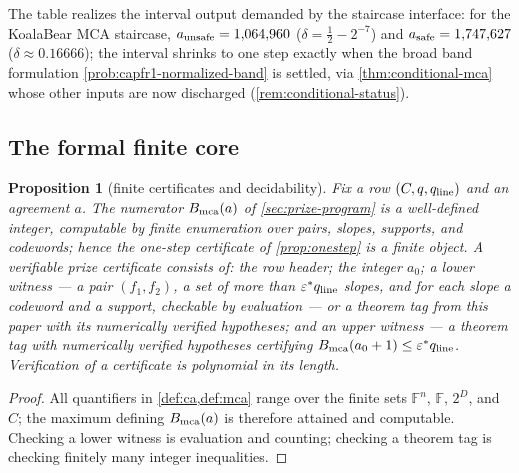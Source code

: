 \documentclass[11pt]{article}
\newtheorem{proposition}[proposition]{Proposition}
\theoremstyle{definition}
\theoremstyle{remark}
\newcommand{\F}{\mathbb{F}}
\begin{document}
The table realizes the interval output demanded by the staircase interface: for the KoalaBear MCA staircase, $a_{\rm unsafe}=1{,}064{,}960$ \textup($\delta=\frac12-2^{-7}$\textup) and $a_{\rm safe}=1{,}747{,}627$ \textup($\delta\approx0.16666$\textup); the interval shrinks to one step exactly when the broad band formulation \cref{prob:capfr1-normalized-band} is settled, via \cref{thm:conditional-mca} whose other inputs are now discharged \textup(\cref{rem:conditional-status}\textup).

\subsection{The formal finite core}\label{sec:discharge-T7}

\begin{proposition}[finite certificates and decidability]\label{prop:finite-certificate}
Fix a row $(C,q,q_{\rm line})$ and an agreement $a$. The numerator $B_{\rm mca}(a)$ of \cref{sec:prize-program} is a well-defined integer, computable by finite enumeration over pairs, slopes, supports, and codewords; hence the one-step certificate of \cref{prop:onestep} is a finite object. A verifiable prize certificate consists of: the row header; the integer $a_0$; a \emph{lower witness} --- a pair $(f_1,f_2)$, a set of more than $\varepsilon^*q_{\rm line}$ slopes, and for each slope a codeword and a support, checkable by evaluation --- or a theorem tag from this paper with its numerically verified hypotheses; and an \emph{upper witness} --- a theorem tag with numerically verified hypotheses certifying $B_{\rm mca}(a_0+1)\le\varepsilon^*q_{\rm line}$. Verification of a certificate is polynomial in its length.
\end{proposition}

\begin{proof}
All quantifiers in \cref{def:ca,def:mca} range over the finite sets $\F^n$, $\F$, $2^D$, and $C$; the maximum defining $B_{\rm mca}(a)$ is therefore attained and computable. Checking a lower witness is evaluation and counting; checking a theorem tag is checking finitely many integer inequalities.
\end{proof}
\end{document}
